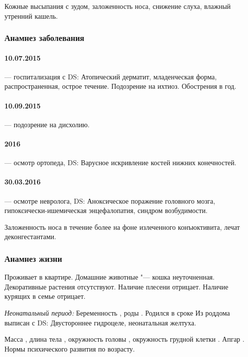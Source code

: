 \documentclass[a4paper,14pt]{extarticle}
\newcommand{\gramm}{г}
\newcommand{\cm}{см}
\newcommand{\weeks}{нед.}
\begin{document}
Кожные высыпания с зудом, заложенность носа, снижение слуха, влажный утренний кашель.

\subsubsection*{Анамнез заболевания}

\paragraph{10.07.2015} --- госпитализация с DS: Атопический дерматит, младенческая форма, распространенная, острое течение. Подозрение на ихтиоз. Обострения  в год.

\paragraph{10.09.2015} --- подозрение на дисхолию.

\paragraph{2016} --- осмотр ортопеда, DS: Варусное искривление костей нижних конечностей.

\paragraph{30.03.2016} --- осмотре невролога, DS: Аноксическое поражение головного мозга, гипоксически-ишемическая энцефалопатия, синдром возбудимости.

Заложенность носа в течение более  на фоне излеченного конъюктивита, лечат деконгестантами.

\subsubsection*{Анамнез жизни}

Проживает в квартире. Домашние животные "--- кошка неуточненная. Декоративные растения отсутствуют. Наличие плесени отрицает. Наличие курящих в семье отрицает.

\emph{Неонатальный период:} Беременность , роды . Родился в сроке \numprint[\weeks]{41} Из роддома выписан с DS: Двустороннее гидроцеле, неонатальная желтуха.

Масса \numprint[\gramm]{4630}, длина тела \numprint[\cm]{57}, окружность головы \numprint[\cm]{36}, окружность грудной клетки \numprint[\cm]{37}. Апгар . Нормы психического развития по возрасту.
\end{document}
